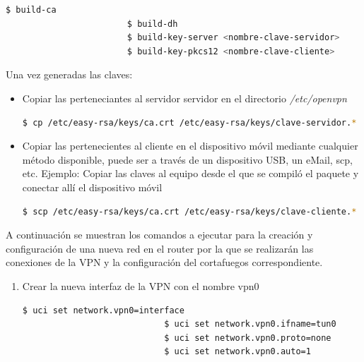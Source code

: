 \documentclass[12pt]{article}
\begin{document}
\begin{enumerate}
                    \begin{lstlisting}[language=bash]
                        $ build-ca
                        $ build-dh
                        $ build-key-server <nombre-clave-servidor>
                        $ build-key-pkcs12 <nombre-clave-cliente>
                    \end{lstlisting}

                    Una vez generadas las claves:
                    
                        \begin{itemize}

                            \item Copiar las perteneciantes al servidor servidor en el directorio \textit{/etc/openvpn}
                            \begin{lstlisting}[language=bash]
                                $ cp /etc/easy-rsa/keys/ca.crt /etc/easy-rsa/keys/clave-servidor.* /etc/easy-rsa/keys/dh2048.pem /etc/openvpn
                            \end{lstlisting}

                            \item Copiar las pertenecientes al cliente en el dispositivo móvil mediante cualquier método disponible, puede ser a través de un dispositivo USB, un eMail, scp, etc.
                            Ejemplo: Copiar las claves al equipo desde el que se compiló el paquete y conectar allí el dispositivo móvil
                            \begin{lstlisting}[language=bash]
                                $ scp /etc/easy-rsa/keys/ca.crt /etc/easy-rsa/keys/clave-cliente.* root@192.168.0.100:/etc/openvpn
                            \end{lstlisting}
                        \end{itemize}   
                    
                    A continuación se muestran los comandos a ejecutar para la creación y configuración de una nueva red en el router por la que se realizarán las conexiones de la VPN y la configuración del cortafuegos correspondiente.

                    \begin{enumerate}
                        \item Crear la nueva interfaz de la VPN con el nombre vpn0
                            
                        \begin{lstlisting}[language=bash]
                            $ uci set network.vpn0=interface
                            $ uci set network.vpn0.ifname=tun0
                            $ uci set network.vpn0.proto=none
                            $ uci set network.vpn0.auto=1        
                        \end{lstlisting}


\end{enumerate}
\end{enumerate}
\end{document}
